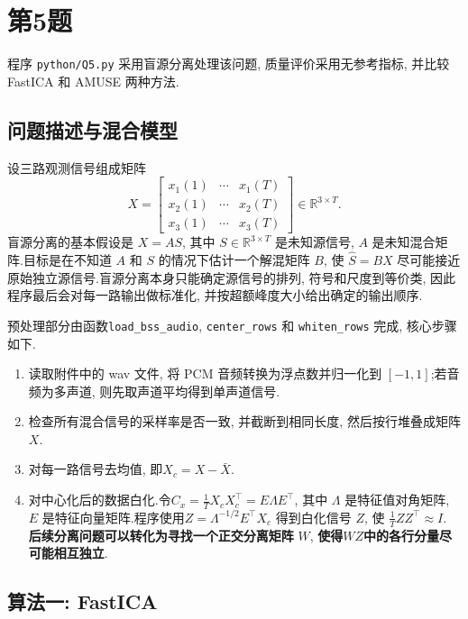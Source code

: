 ﻿\documentclass[UTF8,  zihao=-4]{ctexart}
\begin{document}
\section{第5题}

程序
\texttt{python/Q5.py} 采用盲源分离处理该问题,  质量评价采用无参考指标,   并比较FastICA \cite{Hyvarinen1999FastICA} 和 AMUSE \cite{Tong1991Indeterminacy}两种方法.

\subsection{问题描述与混合模型}

设三路观测信号组成矩阵
\[
    X=
    \begin{bmatrix}
        x_1(1) & \cdots & x_1(T)\\
        x_2(1) & \cdots & x_2(T)\\
        x_3(1) & \cdots & x_3(T)
    \end{bmatrix}
    \in\mathbb R^{3\times T}.
\]
盲源分离的基本假设是
$X=A S$,  
其中 \(S\in\mathbb R^{3\times T}\) 是未知源信号,   \(A\) 是未知混合矩阵.目标是在不知道 \(A\) 和 \(S\) 的情况下估计一个解混矩阵 \(B\),  使
$\hat S=BX$
尽可能接近原始独立源信号.盲源分离本身只能确定源信号的排列,  符号和尺度到等价类,  因此程序最后会对每一路输出做标准化,  并按超额峰度大小给出确定的输出顺序.

预处理部分由函数\texttt{load\_bss\_audio},  \texttt{center\_rows} 和 \texttt{whiten\_rows} 完成,  核心步骤如下.

\begin{enumerate}
    \item 读取附件中的 wav 文件,  将 PCM 音频转换为浮点数并归一化到 \([-1,  1]\);若音频为多声道,  则先取声道平均得到单声道信号.
    \item 检查所有混合信号的采样率是否一致,  并截断到相同长度,  然后按行堆叠成矩阵 \(X\).
    \item 对每一路信号去均值,   即$X_c=X-\bar X$.
    \item 对中心化后的数据白化.令$C_x=\frac{1}{T}X_cX_c^\top=E\Lambda E^\top$,  
    其中 \(\Lambda\) 是特征值对角矩阵,  \(E\) 是特征向量矩阵.程序使用$
        Z=\Lambda^{-1/2}E^\top X_c$
    得到白化信号 \(Z\),  使 \(\frac{1}{T}ZZ^\top\approx I\). \textbf{后续分离问题可以转化为寻找一个正交分离矩阵} $W$,  \textbf{使得}$WZ$\textbf{中的各行分量尽可能相互独立}.
\end{enumerate}

\subsection{算法一: FastICA}
\end{document}
